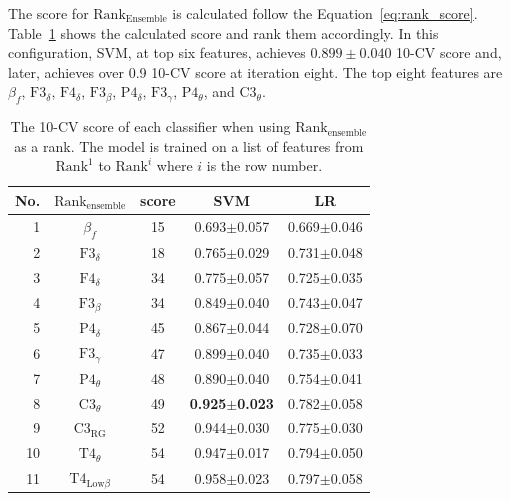 \documentclass[pdflatex,sn-mathphys]{sn-jnl}%
\theoremstyle{thmstyleone}%
\theoremstyle{thmstyletwo}%
\theoremstyle{thmstylethree}%
\begin{document}
The score for $\text{Rank}_{\text{Ensemble}}$ is calculated follow the Equation~\ref{eq:rank_score}. Table~\ref{tab:cv_ensemble} shows the calculated score and rank them accordingly. In this configuration, SVM, at top six features, achieves $0.899\pm0.040$ 10-CV score and, later, achieves over 0.9 10-CV score at iteration eight. The top eight features are $\beta_{f}$, $\text{F3}_{\delta}$, $\text{F4}_{\delta}$, $\text{F3}_{\beta}$, $\text{P4}_{\delta}$, $\text{F3}_{\gamma}$, $\text{P4}_{\theta}$, and $\text{C3}_{\theta}$.

\begin{table}[h!]
\centering
\caption{The 10-CV score of each classifier when using $\text{Rank}_{\text{ensemble}}$ as a rank. The model is trained on a list of features from $\text{Rank}^1$ to $\text{Rank}^i$ where $i$ is the row number.}
\label{tab:cv_ensemble}
\begin{tabular}{r|cccc}
\hline
 No. & $\text{Rank}_{\text{ensemble}}$ &  score &                      SVM &                       LR \\
\hline
   1 &                     $\beta_{f}$ &     15 &          0.693$\pm$0.057 &          0.669$\pm$0.046 \\
   2 &            $\text{F3}_{\delta}$ &     18 &          0.765$\pm$0.029 &          0.731$\pm$0.048 \\
   3 &            $\text{F4}_{\delta}$ &     34 &          0.775$\pm$0.057 &          0.725$\pm$0.035 \\
   4 &             $\text{F3}_{\beta}$ &     34 &          0.849$\pm$0.040 &          0.743$\pm$0.047 \\
   5 &            $\text{P4}_{\delta}$ &     45 &          0.867$\pm$0.044 &          0.728$\pm$0.070 \\
   6 &            $\text{F3}_{\gamma}$ &     47 &          0.899$\pm$0.040 &          0.735$\pm$0.033 \\
   7 &            $\text{P4}_{\theta}$ &     48 &          0.890$\pm$0.040 &          0.754$\pm$0.041 \\
   8 &            $\text{C3}_{\theta}$ &     49 & \textbf{0.925$\pm$0.023} &          0.782$\pm$0.058 \\
   9 &         $\text{C3}_{\text{RG}}$ &     52 &          0.944$\pm$0.030 &          0.775$\pm$0.030 \\
  10 &            $\text{T4}_{\theta}$ &     54 &          0.947$\pm$0.017 &          0.794$\pm$0.050 \\
  11 &   $\text{T4}_{\text{Low}\beta}$ &     54 &          0.958$\pm$0.023 &          0.797$\pm$0.058 \\

\end{tabular}
\end{table}
\end{document}
